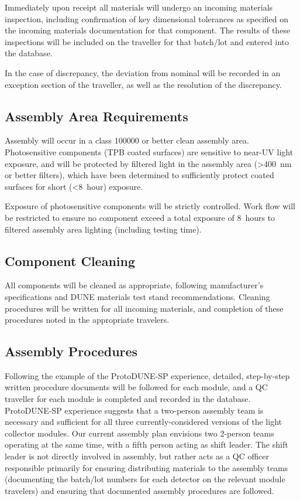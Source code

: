 Immediately upon receipt all materials will undergo an incoming materials inspection, including confirmation of key dimensional tolerances as specified on the incoming materials documentation for that component.  The results of these inspections will be included on the traveller for that batch/lot and entered into the database.

In the case of discrepancy, the deviation from nominal will be recorded in an exception section of the traveller, as well as the resolution of the discrepancy.

\subsection{Assembly Area Requirements}

Assembly will occur in a class \num{100000} or better clean assembly area.  Photosensitive components (TPB coated surfaces) are sensitive to near-UV light exposure, and will be protected by filtered light in the assembly area (>\SI{400}{nm} or better filters), which have been determined to sufficiently protect coated surfaces for short (<\SI{8}{hour}) exposure.

Exposure of photosensitive components will be strictly controlled.  Work flow will be restricted to ensure no component exceed a total exposure of \SI{8}{hours} to filtered assembly area lighting (including testing time).

\subsection{Component Cleaning}

All components will be cleaned  as appropriate, following manufacturer's specifications and DUNE materials test stand recommendations.  Cleaning procedures will be written for all incoming materials, and completion of these procedures noted in the appropriate travelers.

\subsection{Assembly Procedures}

Following the example of the ProtoDUNE-SP experience, detailed, step-by-step written procedure documents will be followed for each module, and a QC traveller for each module is completed and recorded in the database.  ProtoDUNE-SP experience suggests that a two-person assembly team is necessary and sufficient for all three currently-considered versions of the light collector modules.  Our current assembly plan envisions two 2-person teams operating at the same time, with a fifth person acting as shift leader.  The shift leader is not directly involved in assembly, but rather acts as a QC officer responsible primarily for ensuring distributing materials to the assembly teams (documenting the batch/lot numbers for each detector on the relevant module travelers) and ensuring that documented assembly procedures are followed.

